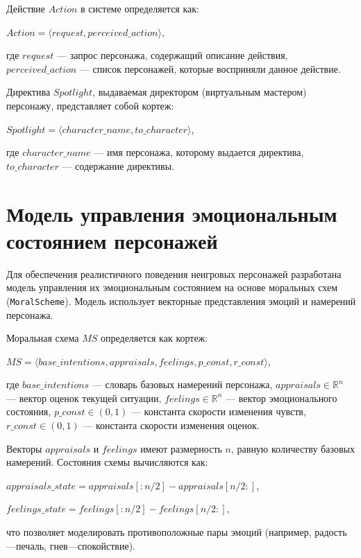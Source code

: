 Действие $Action$ в системе определяется как:
\begin{center}
$Action = \langle request, perceived\_action \rangle$,
\end{center}
\noindent где $request$ --- запрос персонажа, содержащий описание действия, $perceived\_action$ --- список персонажей, которые восприняли данное действие.

Директива $Spotlight$, выдаваемая директором (виртуальным мастером) персонажу, представляет собой кортеж:
\begin{center}
$Spotlight = \langle character\_name, to\_character \rangle$,
\end{center}
\noindent где $character\_name$ --- имя персонажа, которому выдается директива, $to\_character$ --- содержание директивы.




\section{Модель управления эмоциональным состоянием персонажей}

Для обеспечения реалистичного поведения неигровых персонажей разработана модель управления их эмоциональным состоянием на основе моральных схем (\texttt{MoralScheme}). Модель использует векторные представления эмоций и намерений персонажа.

Моральная схема $MS$ определяется как кортеж:
\begin{center}
$MS = \langle base\_intentions, appraisals, feelings, p\_const, r\_const \rangle$,
\end{center}
\noindent где $base\_intentions$ --- словарь базовых намерений персонажа, $appraisals \in \mathbb{R}^n$ --- вектор оценок текущей ситуации, $feelings \in \mathbb{R}^n$ --- вектор эмоционального состояния, $p\_const \in (0, 1)$ --- константа скорости изменения чувств, $r\_const \in (0, 1)$ --- константа скорости изменения оценок.

Векторы $appraisals$ и $feelings$ имеют размерность $n$, равную количеству базовых намерений. Состояния схемы вычисляются как:
\begin{center}
$appraisals\_state = appraisals[:n/2] - appraisals[n/2:]$,
\end{center}
\begin{center}
$feelings\_state = feelings[:n/2] - feelings[n/2:]$,
\end{center}
\noindent что позволяет моделировать противоположные пары эмоций (например, радость---печаль, гнев---спокойствие).

